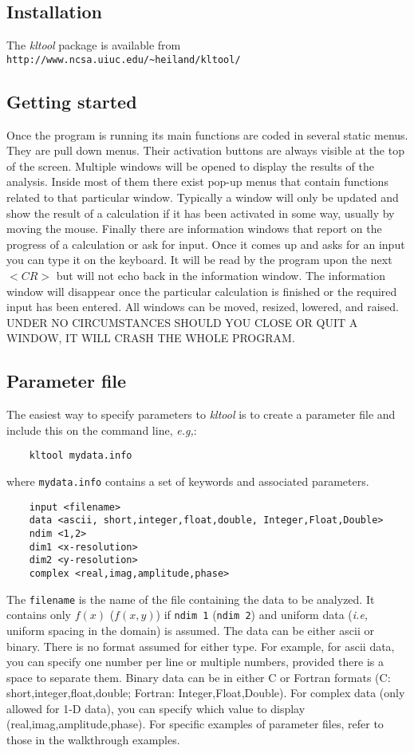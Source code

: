 \subsection{Installation}
\label{sec:installation}
The {\sl kltool} package is available from
{\tt http://www.ncsa.uiuc.edu/\verb'~'heiland/kltool/}

\subsection{Getting started}
Once the program is running its main functions are coded in several static menus. They are pull down menus. Their activation buttons are always visible at the top of the screen. Multiple windows will be opened to display the results of the analysis. Inside most of them there exist pop-up menus that contain functions related to that particular window. Typically a window will only be updated and show the result of a calculation if it has been activated in some way, usually by moving the mouse.  Finally there are information windows that 
report on the progress of a calculation or ask for input. Once it comes up
and asks for an input you can type it on the keyboard. It will be read by the
program upon the next $<CR>$ but will not echo back in the information window. The information window will disappear once the particular calculation is finished or the required input has been entered. 
All windows can be moved, resized, lowered, and raised.\\
UNDER NO CIRCUMSTANCES SHOULD YOU CLOSE OR QUIT A WINDOW, IT WILL CRASH THE WHOLE PROGRAM.

\subsection{Parameter file}
\label{sec:paramfile}
The easiest way to specify parameters to {\sl kltool} is to create a parameter file and
include this on the command line, {\sl e.g,}:
\begin{verbatim}
	kltool mydata.info
\end{verbatim}
where {\tt mydata.info} contains a set of keywords and associated parameters.
\begin{verbatim}
	input <filename>
	data <ascii, short,integer,float,double, Integer,Float,Double>
	ndim <1,2>
	dim1 <x-resolution>
	dim2 <y-resolution>
	complex <real,imag,amplitude,phase>
\end{verbatim}
The {\tt filename} is the name of the file containing the data to be analyzed.
It contains only $f(x)$ ($f(x,y)$) if {\tt ndim 1} ({\tt ndim 2}) and uniform data
({\sl i.e,} uniform spacing in the domain) is assumed.
The data can be either ascii or binary.  There is no format assumed for either type.
For example, for ascii data, you can specify one number per line or multiple numbers,
provided there is a space to separate them.  Binary data can be in either C or Fortran
formats (C: short,integer,float,double;  Fortran: Integer,Float,Double).  For complex data
(only allowed for 1-D data), you can specify which value to display (real,imag,amplitude,phase).
For specific examples of parameter files, refer to those in the walkthrough examples.

